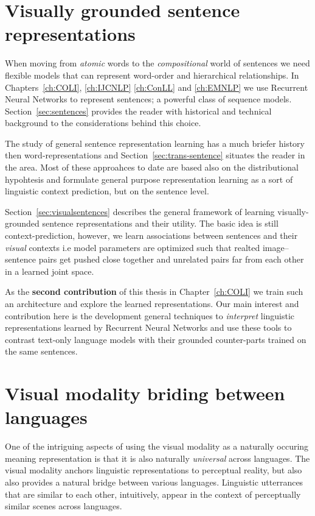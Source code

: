 \section{Visually grounded sentence representations}

When moving from \emph{atomic} words to the \emph{compositional} world of sentences we need flexible
models that can represent word-order and hierarchical relationships.  In Chapters~\ref{ch:COLI}, \ref{ch:IJCNLP}  \ref{ch:ConLL} and \ref{ch:EMNLP} 
we use Recurrent Neural Networks to represent sentences; a powerful class of  sequence models.
Section~\ref{sec:sentences} provides the reader with 
historical and technical background to the considerations behind this choice.

The study of general sentence representation learning has a much briefer history then word-representations
and Section~\ref{sec:trans-sentence} situates the reader in the area. Most of these approahces to date are 
based also on the distributional hypohtesis and formulate general purpose representation learning as a sort of
linguistic context prediction, but on the sentence level. 

Section~\ref{sec:visualsentences} describes the general framework of learning 
visually-grounded sentence representations and their utility. 
The basic idea is still context-prediction, however, we learn associations between 
sentences and their \emph{visual} contexts i.e model parameters are optimized such 
that realted image--sentence pairs get pushed close together and unrelated pairs far 
from each other in a learned joint space.

As the \textbf{second contribution} of this thesis in Chapter~\ref{ch:COLI} 
we train such an architecture and explore the learned representations.
Our main interest and contribution here is the development general techniques to 
\emph{interpret} linguistic representations learned by
Recurrent Neural Networks and use these tools to contrast text-only language 
models with their grounded counter-parts trained on the same sentences.

\section{Visual modality briding between languages}

One of the intriguing aspects of using the visual modality as a naturally occuring 
meaning representation is that it is also naturally \emph{universal} across languages. 
The visual modality anchors linguistic representations to perceptual reality, but also
also provides a natural bridge between various languages. Linguistic utterrances that are similar 
to each other, intuitively, appear in the context of perceptually similar scenes across languages. 

